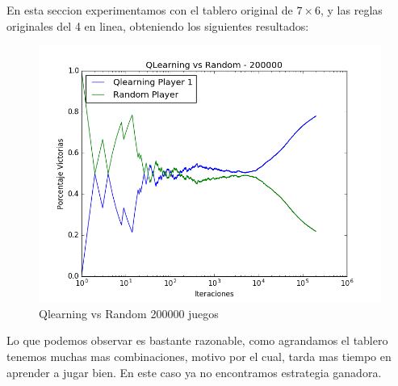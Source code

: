 En esta seccion experimentamos con el tablero original de $7\times6$, y las reglas originales del 4 en linea, obteniendo los siguientes resultados:\\







\begin{figure}[h]
 \centering
  \begin{minipage}[c]{1\textwidth}
	\centering
	\includegraphics[scale=0.5]{resultados/7x6/QlearningVsRandom_200000_7x6_parametros_informe.png}
        \caption{Qlearning vs Random 200000 juegos}
  \end{minipage}
\end{figure}

Lo que podemos observar es bastante razonable, como agrandamos el tablero tenemos muchas mas combinaciones, motivo por el cual, tarda mas tiempo en aprender a jugar bien.
En este caso ya no encontramos estrategia ganadora.

